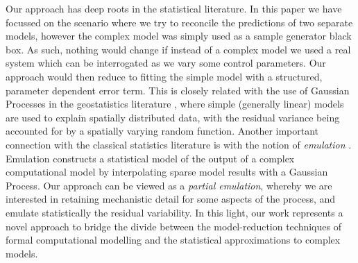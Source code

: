 \documentclass[runningheads,a4paper]{llncs}
\begin{document}
Our approach has deep roots in the statistical literature. In this paper we have focussed on the scenario where we try to reconcile the predictions of two separate models, however the complex model was simply used as a sample generator black box. As such, nothing would change if instead of a complex model we used a real system which can be interrogated as we vary some control parameters. Our approach would then reduce to fitting the simple model with a structured, parameter dependent error term. This is closely related with the use of Gaussian Processes in the geostatistics literature \cite{cressie2015statistics}, where simple (generally linear) models are used to explain spatially distributed data, with the residual variance being accounted for by a spatially varying random function. Another important connection with the classical statistics literature is with the notion of {\it emulation} \cite{kennedy2001bayesian}. Emulation constructs a statistical model of the output of a complex computational model by interpolating sparse model results with a Gaussian Process. Our approach can be viewed as a {\it partial emulation}, whereby we are interested in retaining mechanistic detail for some aspects of the process, and emulate statistically the residual variability. In this light, our work represents a novel approach to bridge the divide between the model-reduction techniques of formal computational modelling and the statistical approximations to complex models.
\end{document}

